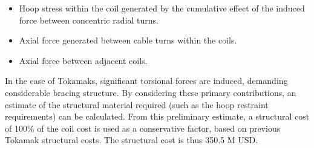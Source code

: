 \begin{itemize}
    \item Hoop stress within the coil generated by the cumulative effect of the induced force between concentric radial turns.
    \item Axial force generated between cable turns within the coils. 
    \item Axial force between adjacent coils.
\end{itemize}


In the case of Tokamaks, significant torsional forces are induced, demanding considerable bracing structure. By considering these primary contributions, an estimate of the structural material required (such as the hoop restraint requirements) can be calculated. From this preliminary estimate, a structural cost of 100\% of the coil cost is used as a conservative factor, based on previous Tokamak structural costs. The structural cost is thus 350.5 M USD.


